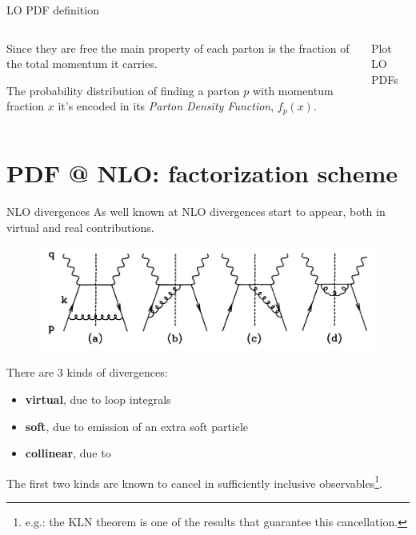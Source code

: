 \documentclass[9pt]{beamer}
\begin{document}
\begin{frame}{LO PDF definition}
    \begin{columns}
        \begin{column}{0.55\textwidth}
            Since they are free the main property of each parton is the
            fraction of the total momentum it carries.\newline

            The probability distribution of finding a parton $p$ with momentum
            fraction $x$ it's encoded in its \textit{Parton Density Function}\footnotemark,
            $f_p(x)$.
        \end{column}
        \begin{column}{0.45\textwidth}
            Plot LO PDFs 

        \end{column}
    \end{columns}
\end{frame}

\section{PDF @ NLO: factorization scheme}
\begin{frame}{NLO divergences}
    As well known at NLO divergences start to appear, both in virtual and real contributions. 
    \begin{figure}
        \centering
        \includegraphics[width=.8\textwidth]{pictures/nlo-real}
    \end{figure}
    There are 3 kinds of divergences:
    \begin{itemize}
        \item \textbf{virtual}, due to loop integrals
        \item \textbf{soft}, due to emission of an extra soft particle
        \item \textbf{collinear}, due to 
    \end{itemize}
    The first two kinds are known to cancel in sufficiently inclusive
    observables\footnote{e.g.: the KLN theorem is one of the results that guarantee
    this cancellation.}.
\end{frame}
\end{document}
